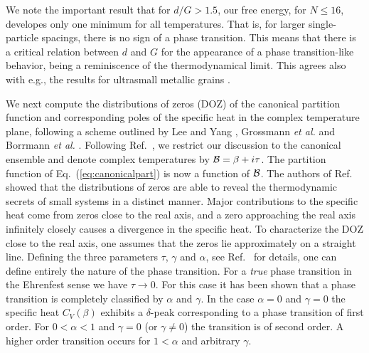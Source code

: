 \begin{multicols}{2}
We note the important result that for $d/G > 1.5$, 
our free energy, for $N\le 16$, developes
only one minimum for all temperatures. That is, for larger single-particle
spacings, there is no sign of a phase transition. This means that there
is a critical relation between $d$ and $G$ for the appearance of a phase 
transition-like behavior, being a  reminiscence of the thermodynamical limit.
This agrees also with e.g., the results for ultrasmall metallic grains
\cite{delft2000}. 

We next compute the distributions of zeros (DOZ)
of the canonical partition
function and corresponding poles of the specific heat in 
the complex temperature plane, following a 
scheme outlined by Lee and Yang \cite{leeyang}, Grossmann
{\em et al.} \cite{grossmann} and Borrmann {\em et al.} \cite{borrmann2000}. 
Following Ref.~\cite{borrmann2000},
we restrict our discussion to the canonical ensemble and
denote complex temperatures by $ {\cal B} = \beta + i \tau$.
The partition function of Eq.~(\ref{eq:canonicalpart}) is now a function
of ${\cal B}$. 
The authors of Ref.~\cite{borrmann2000} showed that the 
distributions of zeros are able to reveal the
thermodynamic secrets of small systems in a distinct manner.
Major contributions 
to the specific heat come from zeros close to the real axis, and
a zero approaching the real axis infinitely closely causes 
a divergence in the specific heat. 
To characterize the DOZ close to the real axis, one assumes 
that the zeros lie approximately on a straight line.  
Defining the three parameters $\tau$, $\gamma$ and $\alpha$, see
Ref.~\cite{borrmann2000} for details,
one can define entirely the nature of the phase transition.
For a {\sl true} phase
transition in the Ehrenfest sense we have $\tau \rightarrow 0$. For
this case it has been shown \cite{grossmann} that a phase transition is
completely classified by $\alpha$ and $\gamma$.  In the case $\alpha =
0$ and $\gamma = 0$ the specific heat $C_V(\beta)$ exhibits a
$\delta$-peak corresponding to a phase transition of first order. For 
$0 < \alpha < 1$ and $\gamma =0$ (or $\gamma \neq 0$) the transition is of
second order. A higher order transition occurs for  $1 < \alpha $ and
arbitrary $\gamma$.  


\end{multicols}
